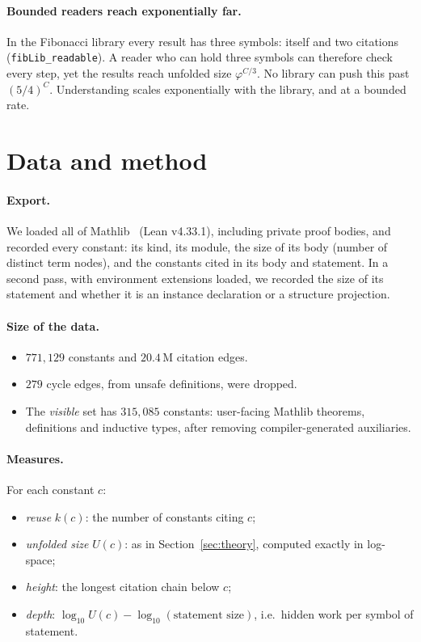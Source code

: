 \documentclass[11pt]{article}
\theoremstyle{remark}
\newcommand{\lean}[1]{\texttt{#1}}
\begin{document}
\paragraph{Bounded readers reach exponentially far.} In the Fibonacci library every
result has three symbols: itself and two citations (\lean{fibLib\_readable}). A reader who
can hold three symbols can therefore check every step, yet the results reach unfolded size
$\varphi^{C/3}$. No library can push this past $(5/4)^C$. Understanding scales
exponentially with the library, and at a bounded rate.

\section{Data and method}\label{sec:data}

\paragraph{Export.} We loaded all of Mathlib~\cite{mathlib} (Lean v4.33.1), including private proof
bodies, and recorded every constant: its kind, its module, the size of its body (number of
distinct term nodes), and the constants cited in its body and statement. In a second pass,
with environment extensions loaded, we recorded the size of its statement and whether it is
an instance declaration or a structure projection.

\paragraph{Size of the data.}
\begin{itemize}
\item $771{,}129$ constants and $20.4$\,M citation edges.
\item $279$ cycle edges, from unsafe definitions, were dropped.
\item The \emph{visible} set has $315{,}085$ constants: user-facing Mathlib theorems,
  definitions and inductive types, after removing compiler-generated auxiliaries.
\end{itemize}

\paragraph{Measures.} For each constant $c$:
\begin{itemize}
\item \emph{reuse} $k(c)$: the number of constants citing $c$;
\item \emph{unfolded size} $U(c)$: as in Section~\ref{sec:theory}, computed exactly in
  log-space;
\item \emph{height}: the longest citation chain below $c$;
\item \emph{depth}: $\log_{10}U(c)-\log_{10}(\text{statement size})$, i.e.\ hidden work
  per symbol of statement.
\end{itemize}
\end{document}
